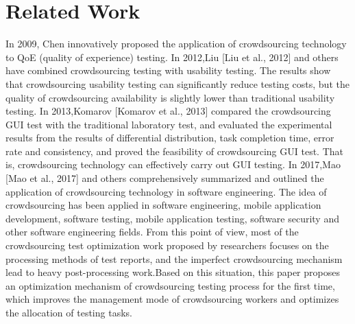 \section{Related Work}
In 2009, Chen innovatively proposed the application of crowdsourcing technology to QoE (quality of experience) testing. In 2012,Liu [Liu et al., 2012] and others have combined crowdsourcing testing with usability testing. The results show that crowdsourcing usability testing can significantly reduce testing costs, but the quality of crowdsourcing availability is slightly lower than traditional usability testing. In 2013,Komarov [Komarov et al., 2013] compared the crowdsourcing GUI test with the traditional laboratory test, and evaluated the experimental results from the results of differential distribution, task completion time, error rate and consistency, and proved the feasibility of crowdsourcing GUI test. That is, crowdsourcing technology can effectively carry out GUI testing. In 2017,Mao [Mao et al., 2017] and others comprehensively summarized and outlined the application of crowdsourcing technology in software engineering. The idea of crowdsourcing has been applied in software engineering, mobile application development, software testing, mobile application testing, software security and other software engineering fields. 
From this point of view, most of the crowdsourcing test optimization work proposed by researchers focuses on the processing methods of test reports, and the imperfect crowdsourcing mechanism lead to heavy post-processing work.Based on this situation, this paper proposes an optimization mechanism of crowdsourcing testing process for the first time, which improves the management mode of crowdsourcing workers and optimizes the allocation of testing tasks.

